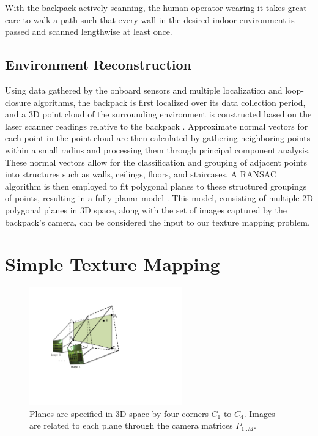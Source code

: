 \documentclass[10pt,twocolumn,letterpaper]{article}
\begin{document}
With the backpack actively scanning, the human operator wearing it
takes great care to walk a path such that every wall in the desired
indoor environment is passed and scanned lengthwise at least once.

\subsection{Environment Reconstruction}
Using data gathered by the onboard sensors and multiple localization
and loop-closure algorithms, the backpack is first localized over its
data collection period, and a 3D point cloud of the surrounding
environment is constructed based on the laser scanner readings
relative to the backpack \cite{chen2010indoor}. Approximate normal
vectors for each point in the point cloud are then calculated by
gathering neighboring points within a small radius and processing them
through principal component analysis. These normal vectors allow for
the classification and grouping of adjacent points into structures
such as walls, ceilings, floors, and staircases. A RANSAC algorithm is
then employed to fit polygonal planes to these structured groupings of
points, resulting in a fully planar model
\cite{sanchez2012point}. This model, consisting of multiple 2D
polygonal planes in 3D space, along with the set of images captured by
the backpack's camera, can be considered the input to our texture
mapping problem.


\section{Simple Texture Mapping}

\begin{figure}
  \centering
  \includegraphics[height=2in]{Projection.pdf}
  \caption{Planes are specified in 3D space by four corners $C_1$ to
    $C_4$. Images are related to each plane through the camera
    matrices $P_{1..M}$. }
  \label{fig:projection}
\end{figure}
\end{document}
